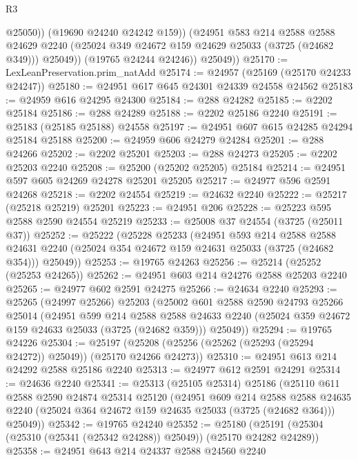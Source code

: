 \begin{lexlean}{R3}
\begin{coremodule}
                  @25050))
              (@19690 @24240 @24242 @159))
            (@24951
              @583
              @214
              @2588
              @2588
              @24629
              @2240
              (@25024 @349 @24672 @159 @24629 @25033 (@3725 (@24682 @349)))
              @25049))
          (@19765 @24244 @24246))
        @25049))
@25170 := LexLeanPreservation.prim_natAdd
@25174 := @24957 (@25169 (@25170 @24233 @24247))
@25180 := @24951 @617 @645 @24301 @24339 @24558 @24562
@25183 := @24959 @616 @24295 @24300
@25184 := @288 @24282
@25185 := @2202 @25184
@25186 := @288 @24289
@25188 := @2202 @25186 @2240
@25191 := @25183 (@25185 @25188) @24558
@25197 := @24951 @607 @615 @24285 @24294 @25184 @25188
@25200 := @24959 @606 @24279 @24284
@25201 := @288 @24266
@25202 := @2202 @25201
@25203 := @288 @24273
@25205 := @2202 @25203 @2240
@25208 := @25200 (@25202 @25205) @25184
@25214 := @24951 @597 @605 @24269 @24278 @25201 @25205
@25217 := @24977 @596 @2591 @24268
@25218 := @2202 @24554
@25219 := @24632 @2240
@25222 := @25217 (@25218 @25219) @25201
@25223 := @24951 @206
@25228 := @25223 @595 @2588 @2590 @24554 @25219
@25233 := @25008 @37 @24554 (@3725 (@25011 @37))
@25252 := @25222
    (@25228
      @25233
      (@24951
        @593
        @214
        @2588
        @2588
        @24631
        @2240
        (@25024 @354 @24672 @159 @24631 @25033 (@3725 (@24682 @354)))
        @25049))
@25253 := @19765 @24263
@25256 := @25214 (@25252 (@25253 @24265))
@25262 := @24951 @603 @214 @24276 @2588 @25203 @2240
@25265 := @24977 @602 @2591 @24275
@25266 := @24634 @2240
@25293 := @25265
    (@24997 @25266)
    @25203
    (@25002
      @601
      @2588
      @2590
      @24793
      @25266
      @25014
      (@24951
        @599
        @214
        @2588
        @2588
        @24633
        @2240
        (@25024 @359 @24672 @159 @24633 @25033 (@3725 (@24682 @359)))
        @25049))
@25294 := @19765 @24226
@25304 := @25197 (@25208 (@25256 (@25262 (@25293 (@25294 @24272)) @25049)) (@25170 @24266 @24273))
@25310 := @24951 @613 @214 @24292 @2588 @25186 @2240
@25313 := @24977 @612 @2591 @24291
@25314 := @24636 @2240
@25341 := @25313
    (@25105 @25314)
    @25186
    (@25110
      @611
      @2588
      @2590
      @24874
      @25314
      @25120
      (@24951
        @609
        @214
        @2588
        @2588
        @24635
        @2240
        (@25024 @364 @24672 @159 @24635 @25033 (@3725 (@24682 @364)))
        @25049))
@25342 := @19765 @24240
@25352 := @25180 (@25191 (@25304 (@25310 (@25341 (@25342 @24288)) @25049)) (@25170 @24282 @24289))
@25358 := @24951 @643 @214 @24337 @2588 @24560 @2240

\end{coremodule}
\end{lexlean}
